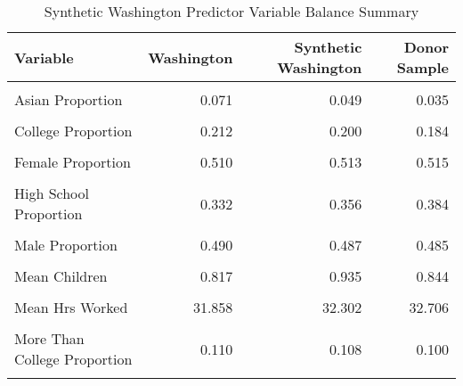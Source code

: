 \begin{table}[H]

\caption{\label{tab:balance_table_washington}Synthetic Washington Predictor Variable Balance Summary}
\centering
\begin{tabular}[t]{lrrr}
\toprule
Variable & Washington & Synthetic Washington & Donor Sample\\
\midrule
\cellcolor{gray!6}{American Indian Proportion} & \cellcolor{gray!6}{0.014} & \cellcolor{gray!6}{0.014} & \cellcolor{gray!6}{0.014}\\
Asian Proportion & 0.071 & 0.049 & 0.035\\
\cellcolor{gray!6}{Black Proportion} & \cellcolor{gray!6}{0.026} & \cellcolor{gray!6}{0.061} & \cellcolor{gray!6}{0.098}\\
College Proportion & 0.212 & 0.200 & 0.184\\
\cellcolor{gray!6}{Employed Proportion} & \cellcolor{gray!6}{0.719} & \cellcolor{gray!6}{0.728} & \cellcolor{gray!6}{0.726}\\
\addlinespace
Female Proportion & 0.510 & 0.513 & 0.515\\
\cellcolor{gray!6}{Hispanic Proportion} & \cellcolor{gray!6}{0.063} & \cellcolor{gray!6}{0.106} & \cellcolor{gray!6}{0.067}\\
High School Proportion & 0.332 & 0.356 & 0.384\\
\cellcolor{gray!6}{Less Than High School Proportion} & \cellcolor{gray!6}{0.065} & \cellcolor{gray!6}{0.072} & \cellcolor{gray!6}{0.090}\\
Male Proportion & 0.490 & 0.487 & 0.485\\
\addlinespace
\cellcolor{gray!6}{Married Proportion} & \cellcolor{gray!6}{0.626} & \cellcolor{gray!6}{0.638} & \cellcolor{gray!6}{0.627}\\
Mean Children & 0.817 & 0.935 & 0.844\\
\cellcolor{gray!6}{Mean Children U5} & \cellcolor{gray!6}{0.173} & \cellcolor{gray!6}{0.202} & \cellcolor{gray!6}{0.174}\\
Mean Hrs Worked & 31.858 & 32.302 & 32.706\\
\cellcolor{gray!6}{Median Income} & \cellcolor{gray!6}{22900.000} & \cellcolor{gray!6}{21956.634} & \cellcolor{gray!6}{21327.955}\\
\addlinespace
More Than College Proportion & 0.110 & 0.108 & 0.100\\
\cellcolor{gray!6}{Not Employed Proportion} & \cellcolor{gray!6}{0.281} & \cellcolor{gray!6}{0.272} & \cellcolor{gray!6}{0.274}\\

\end{tabular}
\end{table}
